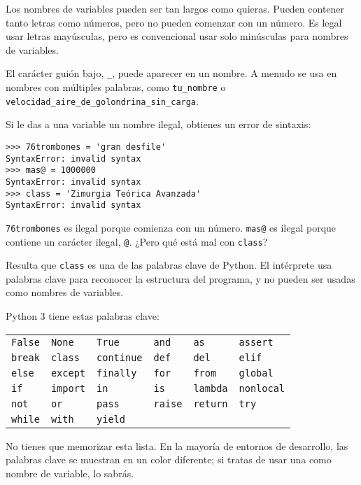 Los nombres de variables pueden ser tan largos como quieras. Pueden contener tanto letras como números, pero no pueden comenzar con un número. Es legal usar letras mayúsculas, pero es convencional usar solo minúsculas para nombres de variables.

El carácter guión bajo, \texttt{\_}, puede aparecer en un nombre. A menudo se usa en nombres con múltiples palabras, como \texttt{tu\_nombre} o \texttt{velocidad\_aire\_de\_golondrina\_sin\_carga}.

Si le das a una variable un nombre ilegal, obtienes un error de sintaxis:

\begin{lstlisting}
>>> 76trombones = 'gran desfile'
SyntaxError: invalid syntax
>>> mas@ = 1000000
SyntaxError: invalid syntax
>>> class = 'Zimurgia Teórica Avanzada'
SyntaxError: invalid syntax
\end{lstlisting}

\texttt{76trombones} es ilegal porque comienza con un número. \texttt{mas@} es ilegal porque contiene un carácter ilegal, \texttt{@}. ¿Pero qué está mal con \texttt{class}?

Resulta que \texttt{class} es una de las palabras clave de Python. El intérprete usa palabras clave para reconocer la estructura del programa, y no pueden ser usadas como nombres de variables.

Python 3 tiene estas palabras clave:

\begin{center}
\begin{tabular}{llllll}
\texttt{False} & \texttt{None} & \texttt{True} & \texttt{and} & \texttt{as} & \texttt{assert} \\
\texttt{break} & \texttt{class} & \texttt{continue} & \texttt{def} & \texttt{del} & \texttt{elif} \\
\texttt{else} & \texttt{except} & \texttt{finally} & \texttt{for} & \texttt{from} & \texttt{global} \\
\texttt{if} & \texttt{import} & \texttt{in} & \texttt{is} & \texttt{lambda} & \texttt{nonlocal} \\
\texttt{not} & \texttt{or} & \texttt{pass} & \texttt{raise} & \texttt{return} & \texttt{try} \\
\texttt{while} & \texttt{with} & \texttt{yield} & & & \\
\end{tabular}
\end{center}

No tienes que memorizar esta lista. En la mayoría de entornos de desarrollo, las palabras clave se muestran en un color diferente; si tratas de usar una como nombre de variable, lo sabrás.


